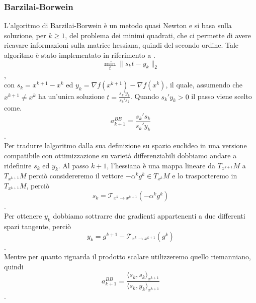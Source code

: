\documentclass[a4paper, 12pt]{article}
\begin{document}
\subsubsection{Barzilai-Borwein}
L'algoritmo di Barzilai-Borwein è un metodo quasi Newton e si basa sulla soluzione, per $k \geq 1$, del problema dei minimi quadrati, che ci permette di avere ricavare informazioni sulla matrice hessiana, quindi del secondo ordine. Tale algoritmo è stato implementato in riferimento a \cite{Iannazzo}.\\
\[\min_{t} \parallel s_kt - y_k \parallel_2 \],\\
con $s_k = x^{k+1} - x^k$ ed $y_k = \nabla f(x^{k+1}) - \nabla f(x^k)$, il quale, assumendo che $x^{k+1} \neq x^k$ ha un'unica soluzione $t = \frac{s_k'y_k}{s_k's_k}$. Quando $s_k'y_k > 0$ il passo viene scelto come.\\
\[a_{k+1}^{BB} = \frac{s_k's_k}{s_k'y_k}\].\\
Per tradurre lalgoritmo dalla sua definizione su spazio euclideo in una versione compatibile con ottimizzazione su varietà differenziabili dobbiamo andare a ridefinire $s_k$ ed $y_k$. Al passo $k+1$, l'hessiana è una mappa lineare da $T_{x^{k+1}}M$ a $T_{x^{k+1}}M$ perciò considereremo il vettore $-\alpha^kg^k \in T_{x^k}M$ e lo trasporteremo in $T_{x^{k+1}}M$, perciò\\
\[s_k = \mathcal{T}_{x^k \to x^{k+1}}(-\alpha^kg^k)\].\\
Per ottenere $y_k$ dobbiamo sottrarre due gradienti appartenenti a due differenti spazi tangente, perciò
\[y_k = g^{k+1} - \mathcal{T}_{x^k \to x^{k+1}}(g^k)\].\\
Mentre per quanto riguarda il prodotto scalare utilizzeremo quello riemanniano, quindi\\
\[a_{k+1}^{BB} = \frac{\langle s_k,s_k \rangle_{x^{k+1}}}{\langle s_k,y_k \rangle_{x^{k+1}}}\].\\
\end{document}
